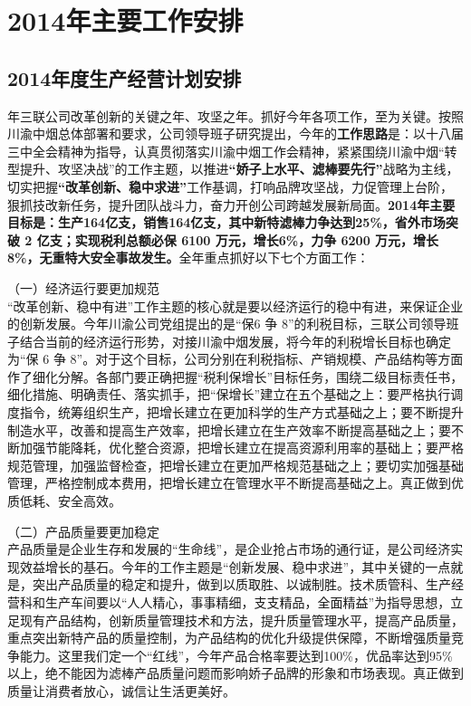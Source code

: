 ﻿\chapter{2014年主要工作安排}
\section{2014年度生产经营计划安排}
 年三联公司改革创新的关键之年、攻坚之年。抓好今年各项工作，至为关键。按照川渝中烟总体部署和要求，公司领导班子研究提出，今年的\textbf{工作思路}是：以十八届三中全会精神为指导，认真贯彻落实川渝中烟工作会精神，紧紧围绕川渝中烟“转型提升、攻坚决战”的工作主题，以推进\textbf{“娇子上水平、滤棒要先行”}战略为主线，切实把握\textbf{“改革创新、稳中求进”}工作基调，打响品牌攻坚战，力促管理上台阶，狠抓技改新任务，提升团队战斗力，奋力开创公司跨越发展新局面。\textbf{2014年主要目标是：生产164亿支，销售164亿支，其中新特滤棒力争达到25\%，省外市场突破 2 亿支；实现税利总额必保 6100 万元，增长6\%，力争 6200 万元，增长8\%，无重特大安全事故发生。}全年重点抓好以下七个方面工作：

（一）经济运行要更加规范\\
\indent “改革创新、稳中有进”工作主题的核心就是要以经济运行的稳中有进，来保证企业的创新发展。今年川渝公司党组提出的是“保6 争 8”的利税目标，三联公司领导班子结合当前的经济运行形势，对接川渝中烟发展，将今年的利税增长目标也确定为“保 6 争 8”。对于这个目标，公司分别在利税指标、产销规模、产品结构等方面作了细化分解。各部门要正确把握“税利保增长”目标任务，围绕二级目标责任书，细化措施、明确责任、落实抓手，把“保增长”建立在五个基础之上：要严格执行调度指令，统筹组织生产，把增长建立在更加科学的生产方式基础之上；要不断提升制造水平，改善和提高生产效率，把增长建立在生产效率不断提高基础之上；要不断加强节能降耗，优化整合资源，把增长建立在提高资源利用率的基础上；要严格规范管理，加强监督检查，把增长建立在更加严格规范基础之上；要切实加强基础管理，严格控制成本费用，把增长建立在管理水平不断提高基础之上。真正做到优质低耗、安全高效。


（二）产品质量要更加稳定\\
\indent
产品质量是企业生存和发展的“生命线”，是企业抢占市场的通行证，是公司经济实现效益增长的基石。今年的工作主题是“创新发展、稳中求进”，其中关键的一点就是，突出产品质量的稳定和提升，做到以质取胜、以诚制胜。技术质管科、生产经营科和生产车间要以“人人精心，事事精细，支支精品，全面精益”为指导思想，立足现有产品结构，创新质量管理技术和方法，提升质量管理水平，提高产品质量，重点突出新特产品的质量控制，为产品结构的优化升级提供保障，不断增强质量竞争能力。这里我们定一个“红线”，今年产品合格率要达到100\%，优品率达到95\% 以上，绝不能因为滤棒产品质量问题而影响娇子品牌的形象和市场表现。真正做到质量让消费者放心，诚信让生活更美好。

